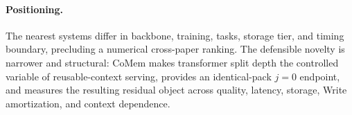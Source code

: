 \paragraph{Positioning.}
The nearest systems differ in backbone, training, tasks, storage tier, and
timing boundary, precluding a numerical cross-paper ranking. The defensible
novelty is narrower and structural: CoMem makes transformer split depth the
controlled variable of reusable-context serving, provides an identical-pack
$j{=}0$ endpoint, and measures the resulting residual object across quality,
latency, storage, Write amortization, and context dependence.
